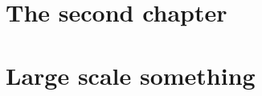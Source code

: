 \documentclass{ucbthesis}
\begin{document}
\chapter{The second chapter}








% 

\chapter{Large scale something}








\printbibliography
\end{document}
